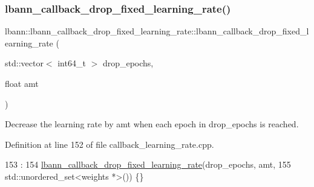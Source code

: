 \subsubsection{\texorpdfstring{lbann\+\_\+callback\+\_\+drop\+\_\+fixed\+\_\+learning\+\_\+rate()}{lbann\_callback\_drop\_fixed\_learning\_rate()}\hspace{0.1cm}{\footnotesize\ttfamily [1/3]}}
{\footnotesize\ttfamily lbann\+::lbann\+\_\+callback\+\_\+drop\+\_\+fixed\+\_\+learning\+\_\+rate\+::lbann\+\_\+callback\+\_\+drop\+\_\+fixed\+\_\+learning\+\_\+rate (\begin{DoxyParamCaption}\item[{std\+::vector$<$ int64\+\_\+t $>$}]{drop\+\_\+epochs,  }\item[{float}]{amt }\end{DoxyParamCaption})}

Decrease the learning rate by amt when each epoch in drop\+\_\+epochs is reached. 

Definition at line 152 of file callback\+\_\+learning\+\_\+rate.\+cpp.


\begin{DoxyCode}
153                                              :
154   \hyperlink{classlbann_1_1lbann__callback__drop__fixed__learning__rate_a28f58eb50813e638d865179d645908f2}{lbann\_callback\_drop\_fixed\_learning\_rate}(drop\_epochs, amt,
155                                           std::unordered\_set<weights *>()) \{\}
\end{DoxyCode}
\mbox{\label{classlbann_1_1lbann__callback__drop__fixed__learning__rate_acd69c6b5aa7e4d799dba7dab2cd5daa4}} 
